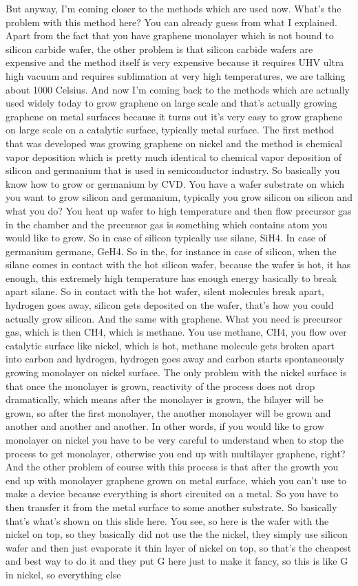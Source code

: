 But anyway, I'm coming closer to the methods which are used now. What's the problem with this method here? You can already guess from what I explained. Apart from the fact that you have graphene monolayer which is not bound to silicon carbide wafer, the other problem is that silicon carbide wafers are expensive and the method itself is very expensive because it requires UHV ultra high vacuum and requires sublimation at very high temperatures, we are talking about 1000 Celsius. And now I'm coming back to the methods which are actually used widely today to grow graphene on large scale and that's actually growing graphene on metal surfaces because it turns out it's very easy to grow graphene on large scale on a catalytic surface, typically metal surface. The first method that was developed was growing graphene on nickel and the method is chemical vapor deposition which is pretty much identical to chemical vapor deposition of silicon and germanium that is used in semiconductor industry. So basically you know how to grow or germanium by CVD. You have a wafer substrate on which you want to grow silicon and germanium, typically you grow silicon on silicon and what you do? You heat up wafer to high temperature and then flow precursor gas in the chamber and the precursor gas is something which contains atom you would like to grow. So in case of silicon typically use silane, SiH4. In case of germanium germane, GeH4. So in the, for instance in case of silicon, when the silane comes in contact with the hot silicon wafer, because the wafer is hot, it has enough, this extremely high temperature has enough energy basically to break apart silane. So in contact with the hot wafer, silent molecules break apart, hydrogen goes away, silicon gets deposited on the wafer, that's how you could actually grow silicon. And the same with graphene. What you need is precursor gas, which is then CH4, which is methane. You use methane, CH4, you flow over catalytic surface like nickel, which is hot, methane molecule gets broken apart into carbon and hydrogen, hydrogen goes away and carbon starts spontaneously growing monolayer on nickel surface. The only problem with the nickel surface is that once the monolayer is grown, reactivity of the process does not drop dramatically, which means after the monolayer is grown, the bilayer will be grown, so after the first monolayer, the another monolayer will be grown and another and another and another. In other words, if you would like to grow monolayer on nickel you have to be very careful to understand when to stop the process to get monolayer, otherwise you end up with multilayer graphene, right? And the other problem of course with this process is that after the growth you end up with monolayer graphene grown on metal surface, which you can't use to make a device because everything is short circuited on a metal. So you have to then transfer it from the metal surface to some another substrate. So basically that's what's shown on this slide here. You see, so here is the wafer with the nickel on top, so they basically did not use the the nickel, they simply use silicon wafer and then just evaporate it thin layer of nickel on top, so that's the cheapest and best way to do it and they put G here just to make it fancy, so this is like G in nickel, so everything else 